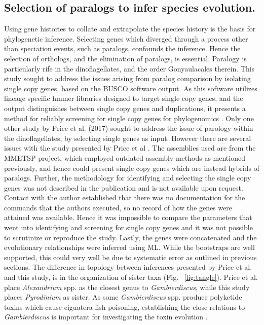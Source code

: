 \documentclass[12pt]{article}
\begin{document}
\subsection*{Selection of paralogs to infer species evolution.}
Using gene histories to collate and extrapolate the species history is the basis for phylogenetic inference.
Selecting genes which diverged through a process other than speciation events, such as paralogs, confounds the inference.
Hence the selection of orthologs, and the elimination of paralogs, is essential.
Paralogy is particularly rife in the dinoflagellates, and the order Gonyaulacales therein. 
This study sought to address the issues arising from paralog comparison by isolating single copy genes, based on the BUSCO software output. 
As this software utilizes lineage specific hmmer libraries designed to target single copy genes, and the output distinguishes between single copy genes and duplications, it presents a method for reliably screening for single copy genes for phylogenomics \cite{waterhouse2017busco}.
Only one other study by Price et al. (2017) sought to address the issue of parology within the dinoflagellates, by selecting single genes as input. 
However there are several issues with the study presented by Price et al \cite{price2017robust}. 
The assemblies used are from the MMETSP project, which employed outdated assembly methods as mentioned previously, and hence could present single copy genes which are instead hybrids of paralogs. 
Further, the methodology for identifying and selecting the single copy genes was not described in the publication and is not available upon request. 
Contact with the author established that there was no documentation for the commands that the authors executed, so no record of how the genes were attained was available. 
Hence it was impossible to compare the parameters that went into identifying and screening for single copy genes and it was not possible to scrutinize or reproduce the study.
Lastly, the genes were concatenated and the evolutionary relationships were inferred using ML. 
While the bootstraps are well supported, this could very well be due to systematic error as outlined in previous sections.
The difference in topology between inferences presented by Price et al. and this study, is in the organization of sister taxa (Fig. ~\ref{fig:tangle}). 
Price et al. place \emph{Alexandrium} spp. as the closest genus to \emph{Gambierdiscus}, while this study places \emph{Pyrodinium} as sister. 
As some \emph{Gambierdiscus} spp. produce polyketide toxins which cause ciguatera fish poisoning, establishing the close relations to \emph{Gambierdiscus} is important for investigating the toxin evolution \cite{pawlowiez2014transcriptome}.
\end{document}
